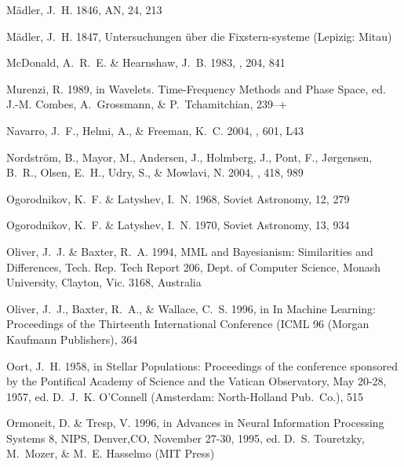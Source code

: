 \begin{thebibliography}{99}
{M{\"a}dler}, J.~H. 1846, AN, 24, 213

{M{\"a}dler}, J.~H. 1847, {Untersuchungen {\"u}ber die Fixstern-systeme}
  (Lepizig: Mitau)

{McDonald}, A.~R.~E. \& {Hearnshaw}, J.~B. 1983, \mnras, 204, 841

{Murenzi}, R. 1989, in Wavelets. Time-Frequency Methods and Phase Space, ed.
  J.-M. {Combes}, A.~{Grossmann}, \& P.~{Tchamitchian}, 239--+

{Navarro}, J.~F., {Helmi}, A., \& {Freeman}, K.~C. 2004, \apjl, 601, L43

{Nordstr{\"o}m}, B., {Mayor}, M., {Andersen}, J., {Holmberg}, J., {Pont}, F.,
  {J{\o}rgensen}, B.~R., {Olsen}, E.~H., {Udry}, S., \& {Mowlavi}, N. 2004,
  \aap, 418, 989

{Ogorodnikov}, K.~F. \& {Latyshev}, I.~N. 1968, Soviet Astronomy, 12, 279

{Ogorodnikov}, K.~F. \& {Latyshev}, I.~N. 1970, Soviet Astronomy, 13, 934

{Oliver}, J.~J. \& {Baxter}, R.~A. 1994, {MML and Bayesianism: Similarities and
  Differences}, Tech. Rep. Tech Report 206, Dept. of Computer Science, Monash
  University, Clayton, Vic. 3168, Australia

{Oliver}, J.~J., {Baxter}, R.~A., \& {Wallace}, C.~S. 1996, in In Machine
  Learning: Proceedings of the Thirteenth International Conference (ICML 96
  (Morgan Kaufmann Publishers), 364

{Oort}, J.~H. 1958, in {Stellar Populations: Proceedings of the conference
  sponsored by the Pontifical Academy of Science and the Vatican Observatory,
  May 20-28, 1957}, ed. D.~J.~K. {O'Connell} ({Amsterdam}: {North-Holland
  Pub.~Co.}), 515

{Ormoneit}, D. \& {Tresp}, V. 1996, in {Advances in Neural Information
  Processing Systems 8, NIPS, Denver,CO, November 27-30, 1995}, ed. D.~S.
  {Touretzky}, M.~{Mozer}, \& M.~E. {Hasselmo} (MIT Press)


\end{thebibliography}
